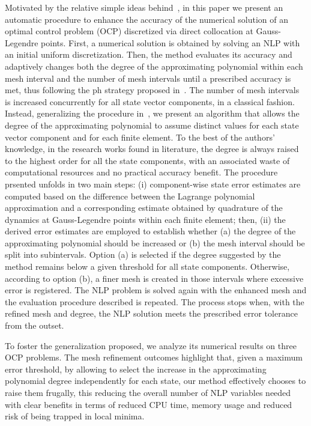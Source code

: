 Motivated by the relative simple ideas behind~\cite{Patterson:OCAM:2015}, in this paper we present an automatic procedure to enhance the accuracy of the numerical solution of an optimal control problem (OCP) discretized via direct collocation at Gauss-Legendre points. First, a numerical solution is obtained by solving an NLP with an initial uniform discretization. Then, the method evaluates its accuracy and adaptively changes both the degree of the approximating polynomial within each mesh interval and the number of mesh intervals until a prescribed accuracy is met, thus following the ph strategy proposed in~\cite{Patterson:OCAM:2015}.
The number of mesh intervals is increased concurrently for all state vector components, in a classical fashion. Instead, generalizing the procedure in~\cite{Patterson:OCAM:2015}, we present an algorithm that allows the degree of the approximating polynomial to assume distinct values for each state vector component and for each finite element. To the best of the authors' knowledge, in the research works found in literature, the degree is always raised to the highest order for all the state components, with an associated waste of computational resources and no practical accuracy benefit.
		The procedure prsented unfolds in two main steps: (i) component-wise state error estimates are computed based on the difference between the Lagrange polynomial approximation and a corresponding estimate obtained by quadrature of the dynamics at Gauss-Legendre points within each finite element; then, (ii) the derived error estimates are employed to establish whether (a) the degree of the approximating polynomial should be increased or (b) the mesh interval should be split into subintervals. Option (a) is selected if the degree suggested by the method remains below a given threshold for all state components. Otherwise, according to option (b), a finer mesh is created in those intervals where excessive error is registered.
The NLP problem is solved again with the enhanced mesh and the evaluation procedure described is repeated. The process stops when, with the refined mesh and degree, the NLP solution meets the prescribed error tolerance from the outset.

To foster the generalization proposed, we analyze its numerical results on three OCP problems. The mesh refinement outcomes highlight that, given a maximum error threshold, by allowing to select the increase in the approximating polynomial degree independently for each state, our method effectively chooses to raise them frugally, this reducing the overall number of NLP variables needed with clear benefits in terms of reduced CPU time, memory usage and reduced risk of being trapped in local minima.

